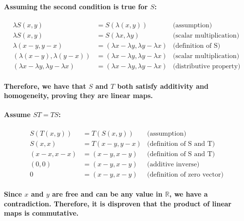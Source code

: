 \documentclass{article}
\begin{document}
\paragraph{\large
Assuming the second condition is true for $S$:}

\begin{align*}
    \lambda S(x, y) &= S(\lambda (x, y)) & \text{(assumption)}\\
    \lambda S(x, y) &= S(\lambda x, \lambda y) & \text{(scalar multiplication)}\\
    \lambda (x-y, y-x) &= (\lambda x-\lambda y, \lambda y-\lambda x) & \text{(definition of S)}\\
    (\lambda (x-y), \lambda (y-x)) &= (\lambda x-\lambda y, \lambda y-\lambda x) & \text{(scalar multiplication)}\\
    (\lambda x-\lambda y, \lambda y-\lambda x) &= (\lambda x-\lambda y, \lambda y-\lambda x) & \text{(distributive property)}
\end{align*}

\paragraph{\large
Therefore, we have that $S$ and $T$ both satisfy additivity and homogeneity, proving they are linear maps.}

\paragraph{\large
Assume $ST = TS$:}

\begin{align*}
    S(T(x, y)) &= T(S(x, y)) & \text{(assumption)}\\
    S(x, x) &= T(x-y,y-x) & \text{(definition of S and T)}\\
    (x-x, x-x) &= (x-y, x-y) & \text{(definition of S and T)}\\
    (0, 0) &= (x-y, x-y) & \text{(additive inverse)}\\
    0 &= (x-y, x-y) & \text{(definition of zero vector)}
\end{align*}

\paragraph{\large
Since $x$ and $y$ are free and can be any value in $\mathbb{R}$, we have a contradiction. Therefore, it is disproven that the product of linear maps is commutative.}
\end{document}
